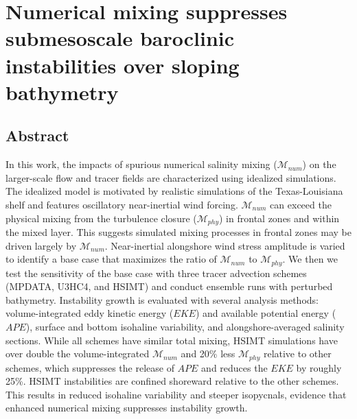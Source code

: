 

\chapter[footnote={This manuscript is \textit{under review} for the \textit{Journal of Advances in Modeling Earth System}. Reprinted with permission from the American Geophysical Union under the terms of the CC BY license. Full citation:  Schlichting, D., Hetland, R. D., \& Jones, C. S. (2024). Numerical mixing suppresses submesoscale baroclinic instabilities over sloping bathymetry. Authorea Preprints. \url{ https://essopenarchive.org/doi/full/10.22541/essoar.170983234.49281676}}]{Numerical mixing suppresses submesoscale baroclinic instabilities over sloping bathymetry}

\section{Abstract}
In this work, the impacts of spurious numerical salinity mixing ($\mathcal{M}_{num}$) on the larger-scale flow and tracer fields are characterized using idealized simulations. The idealized model is motivated by realistic simulations of the Texas-Louisiana shelf and features oscillatory near-inertial wind forcing. $\mathcal{M}_{num}$ can exceed the physical mixing from the turbulence closure ($\mathcal{M}_{phy}$) in frontal zones and within the mixed layer. This suggests simulated mixing processes in frontal zones may be driven largely by $\mathcal{M}_{num}$. Near-inertial alongshore wind stress amplitude is varied to identify a base case that maximizes the ratio of $\mathcal{M}_{num}$ to $\mathcal{M}_{phy}$. We then we test the sensitivity of the base case with three tracer advection schemes (MPDATA, U3HC4, and HSIMT) and conduct ensemble runs with perturbed bathymetry. Instability growth is evaluated with several analysis methods: volume-integrated eddy kinetic energy ($EKE$) and available potential energy ($APE$), surface and bottom isohaline variability, and alongshore-averaged salinity sections. While all schemes have similar total mixing, HSIMT simulations have over double the volume-integrated $\mathcal{M}_{num}$ and 20\% less $\mathcal{M}_{phy}$ relative to other schemes, which suppresses the release of $APE$ and reduces the $EKE$ by roughly 25\%. HSIMT instabilities are confined shoreward relative to the other schemes. This results in reduced isohaline variability and steeper isopycnals, evidence that enhanced numerical mixing suppresses instability growth.

